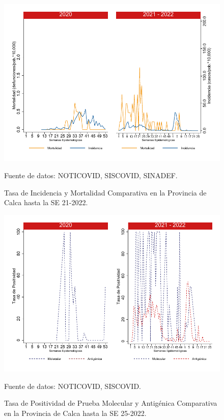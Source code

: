 \documentclass[12pt,a4paper,openany]{book}
\begin{document}
	\begin{figure}[h]
		\caption{Tasa de Incidencia y Mortalidad Comparativa en la Provincia de Calca hasta la SE 21-2022.}\label{fig:inc_mort_calca}
		\begin{center}
			\includegraphics[width=0.85\linewidth]{../figuras/incidencia_mortalidad_20_21_4.pdf}
		\end{center}
		{\footnotesize {Fuente de datos: NOTICOVID, SISCOVID, SINADEF.}}
	\end{figure}
	
	\begin{figure}[h]
		\caption{Tasa de Positividad de Prueba Molecular y Antigénica Comparativa en la Provincia de Calca hasta la SE 25-2022.}\label{fig:positividad_calca}
		\begin{center}
			\includegraphics[width=0.7\linewidth]{../figuras/positividad_20_21_4.pdf}
		\end{center}
		{\footnotesize {Fuente de datos: NOTICOVID, SISCOVID.}}
	\end{figure}
	
\end{document}
